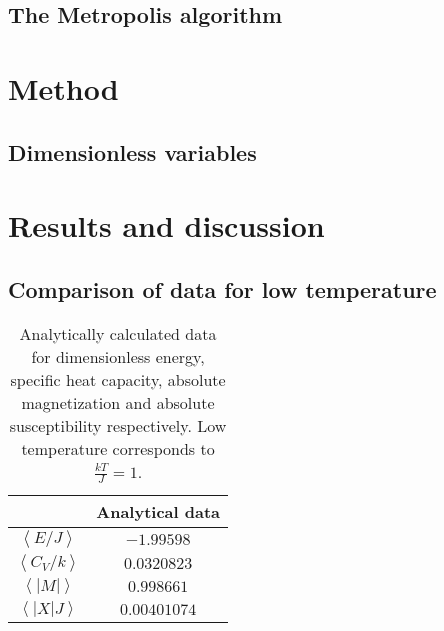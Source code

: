 \documentclass[12pt]{article}
\begin{document}
\begin{flushleft}
\subsection{The Metropolis algorithm}













\newpage
\section{Method}
\subsection{Dimensionless variables}

\newpage
\section{Results and discussion}

\subsection{Comparison of data for low temperature}
\begin{table}[!h]
\begin{center}
\begin{tabular}{| c | c |}
	\hline
	 & \textbf{Analytical data} \\
	\hline	
	 $\left<E/J\right>$ & $-1.99598$\\
	 $\left<C_V/k\right>$ & $0.0320823$\\
	 $\left<|M|\right>$ & $0.998661$ \\
	 $\left<|X|J\right>$ & $0.00401074$\\

  \hline
\end{tabular}
\end{center}
\caption{\label{tab:analytic_low_T}Analytically calculated data for dimensionless energy, specific heat capacity, absolute magnetization and absolute susceptibility respectively. Low temperature corresponds to $\frac{kT}{J} = 1$.}
\end{table}



\end{flushleft}
\end{document}
